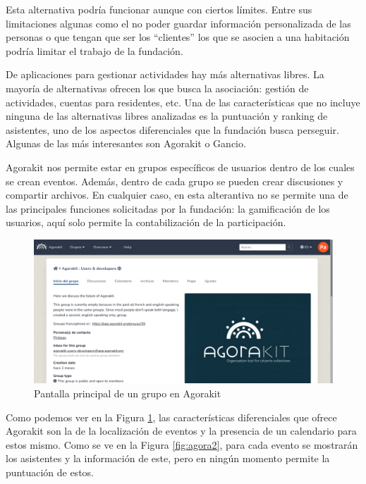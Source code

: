 Esta alternativa podría funcionar aunque con ciertos límites. Entre sus limitaciones algunas como el no poder guardar información personalizada de las personas o que tengan que ser los ``clientes'' los que se asocien a una habitación podría limitar el trabajo de la fundación.

De aplicaciones para gestionar actividades hay más alternativas libres. La mayoría de alternativas ofrecen los que busca la asociación: gestión de actividades, cuentas para residentes, etc. Una de las características que no incluye ninguna de las alternativas libres analizadas es la puntuación y ranking de asistentes, uno de los aspectos diferenciales que la fundación busca perseguir. Algunas de las más interesantes son Agorakit o Gancio.

Agorakit nos permite estar en grupos específicos de usuarios dentro de los cuales se crean eventos. Además, dentro de cada grupo se pueden crear discusiones y compartir archivos. En cualquier caso, en esta alterantiva no se permite una de las principales funciones solicitadas por la fundación: la gamificación de los usuarios, aquí solo permite la contabilización de la participación.

\begin{figure}[h!]
    \centerline{\includegraphics[width=\textwidth]{imagenes/estado_arte/agora.png}}
    \caption{Pantalla principal de un grupo en Agorakit}
    \label{fig:agora}
\end{figure}

Como podemos ver en la Figura \ref{fig:agora}, las características diferenciales que ofrece Agorakit son la de la localización de eventos y la presencia de un calendario para estos mismo. Como se ve en la Figura \ref{fig:agora2}, para cada evento se mostrarán los asistentes y la información de este, pero en ningún momento permite la puntuación de estos.

